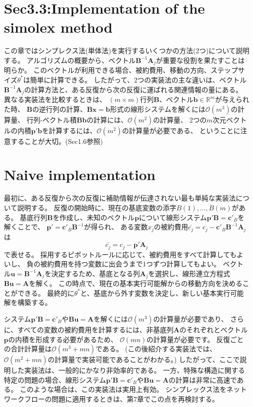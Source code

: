 \documentclass{jsarticle}
\begin{document}
\section*{Sec3.3:Implementation of the simolex method}

この章ではシンプレクス法(単体法)を実行するいくつかの方法(2つ)について説明する。
アルゴリズムの概要から、ベクトル$\bm{B}^{-1}\bm{A}_j$が重要な役割を果たすことは明らか。
このベクトルが利用できる場合、被約費用、移動の方向、ステップサイズ$\theta^{*}$は簡単に計算できる。
したがって、2つの実装法の主な違いは、ベクトル$\bm{B}^{-1}\bm{A}_j$の計算方法と、ある反復から次の反復に運ばれる関連情報の量にある。\\
異なる実装法を比較するときは、
$(m\times m)$行列$\bm{B}$、ベクトル$\bm{b}\in \mathbb{R}^m$が与えられた時、
$\bm{B}$の逆行列の計算、$\bm{Bx} = \bm{b}$形式の線形システムを解くには$\mathcal{O}(m^3)$の計算量、
行列-ベクトル積$\bm{Bb}$の計算には、$\mathcal{O}(m^2)$の計算量、
2つの$m$次元ベクトルの内積$\bm{p}'\bm{b}$を計算するには、$\mathcal{O}(m^2)$の計算量が必要である、
ということに注意することが大切。(Sec1.6参照)\\

\section*{Naive implementation}
最初に、ある反復から次の反復に補助情報が伝達されない最も単純な実装法について説明する。
反復の開始時に、現在の基底変数の添字$B(1),...,B(m)$がある。
基底行列$\bm{B}$を作成し、未知のベクトル$\bm{p}$について線形システム$\bm{p}'\bm{B} = \bm{c}'_B$を解くことで、
$\bm{p}'=\bm{c}'_B\bm{B}^{-1}$が得られ、
ある変数$x_j$の被約費用$\bar{c_j}=c_j-\bm{c}'_B\bm{B}^{-1}\bm{A}_j$は
\begin{equation}
  \bar{c_j}=c_j-\bm{p}'\bm{A}_j
\end{equation}
で表せる。
採用するピボットルールに応じて、被約費用をすべて計算してもよいし、
負の被約費用を持つ変数に出会うまで1つずつ計算してもよい。
ベクトル$\bm{u}=\bm{B}^{-1}\bm{A}_j$を決定するため、基底となる列$\bm{A}_j$を選択し、線形連立方程式$\bm{Bu}=\bm{A}$を解く。
この時点で、現在の基本実行可能解からの移動方向を決めることができる。
最終的に$\theta^{*}$と、基底から外す変数を決定し、新しい基本実行可能解を構築する。

システム$\bm{p}'\bm{B} = \bm{c}'_B$や$\bm{Bu}=\bm{A}$を解くには$\mathcal{O}(m^3)$の計算量が必要であり、
さらに、すべての変数の被約費用を計算するには、非基底列$\bm{A}$のそれぞれとベクトル$\bm{p}$の内積を形成する必要があるため、
$\mathcal{O}(mn)$の計算量が必要です。
反復ごとの合計計算量は$\mathcal{O}(m^3+mn)$である。
(この後紹介する実装法では、$\mathcal{O}(m^2+mn)$の計算量で実装可能であることがわかる。)
したがって、ここで説明した実装法は、一般的にかなり非効率的である。
一方、特殊な構造に関する特定の問題の場合、線形システム$\bm{p}'\bm{B} = \bm{c}'_B$や$\bm{Bu}=\bm{A}$の計算は非常に高速である。
このような場合は、この実装法は実用上有効。
シンプレックス法をネットワークフローの問題に適用するときは、第7章でこの点を再検討する。
\end{document}
